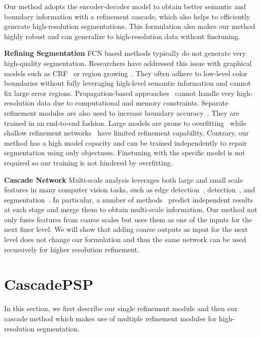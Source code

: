 \documentclass[10pt,twocolumn,letterpaper]{article}
\begin{document}
Our method adopts the encoder-decoder model to obtain better semantic and boundary information with a refinement cascade, which also helps to efficiently generate high-resolution segmentations. This formulation also makes our method highly robust and can generalize to high-resolution data without finetuning.

\noindent \textbf{Refining Segmentation} \space\space
FCN based methods typically do not generate very high-quality segmentation. Researchers have addressed this issue with graphical models such as CRF~\cite{chen2014semantic, chen2017deeplab, lin2016efficient, krahenbuhl2011efficient, liu2015semantic, zheng2015conditional} or region growing~\cite{dias2018semantic}. They often adhere to low-level color boundaries without fully leveraging high-level semantic information and cannot fix large error regions.
Propagation-based approaches~\cite{liu2017learning} cannot handle very high-resolution data due to computational and memory constraints.
Separate refinement modules are also used to increase boundary accuracy~\cite{peng2017large, xu2017deepmatting, zhang2019canet}.
They are trained in an end-to-end fashion. Large models are prone to overfitting~\cite{zhang2019canet} while shallow refinement networks~\cite{peng2017large,xu2017deep} have limited refinement capability. 
Contrary, our method has a high model capacity and can be trained independently to repair segmentation using only objectness. Finetuning with the specific model is not required so our training is not hindered by overfitting. 




\noindent \textbf{Cascade Network} \space \space
Multi-scale analysis leverages both large and small scale features in many computer vision tasks, such as edge detection~\cite{he2019bi, xie2015holistically}, detection~\cite{lin2017feature, liu2016ssd, sun2013deep}, and segmentation~\cite{chen2019collaborative, lin2017refinenet, zhao2018icnet}. 
In particular, a number of methods~\cite{lin2017refinenet, xie2015holistically, zhao2018icnet} predict independent results at each stage and merge them to obtain multi-scale information. 
Our method not only fuses features from coarse scales but uses them as one of the inputs for the next finer level. We will show that adding coarse outputs as input for the next level does not change our formulation and thus the same network can be used recursively for higher resolution refinement.

\vspace{-0.10in}
\section{CascadePSP}
\vspace{-0.05in}
In this section, we first describe our single refinement module and then our cascade method which makes use of multiple refinement modules for high-resolution segmentation.
\end{document}

